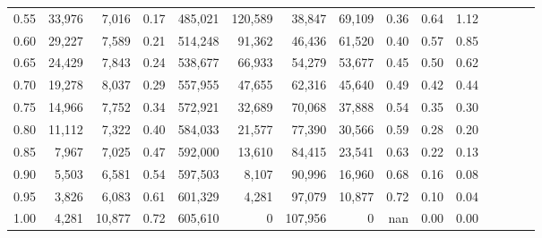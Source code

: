 \begin{tabular}{rrrcrrrrrrrrrrr}
0.55 &  33,976 &   7,016 &                                       0.17 &  485,021 &  120,589 &   38,847 &   69,109 &  0.36 &  0.64 &                         1.12 \\
0.60 &  29,227 &   7,589 &                                       0.21 &  514,248 &   91,362 &   46,436 &   61,520 &  0.40 &  0.57 &                         0.85 \\
0.65 &  24,429 &   7,843 &                                       0.24 &  538,677 &   66,933 &   54,279 &   53,677 &  0.45 &  0.50 &                         0.62 \\
0.70 &  19,278 &   8,037 &                                       0.29 &  557,955 &   47,655 &   62,316 &   45,640 &  0.49 &  0.42 &                         0.44 \\
0.75 &  14,966 &   7,752 &                                       0.34 &  572,921 &   32,689 &   70,068 &   37,888 &  0.54 &  0.35 &                         0.30 \\
0.80 &  11,112 &   7,322 &                                       0.40 &  584,033 &   21,577 &   77,390 &   30,566 &  0.59 &  0.28 &                         0.20 \\
0.85 &   7,967 &   7,025 &                                       0.47 &  592,000 &   13,610 &   84,415 &   23,541 &  0.63 &  0.22 &                         0.13 \\
0.90 &   5,503 &   6,581 &                                       0.54 &  597,503 &    8,107 &   90,996 &   16,960 &  0.68 &  0.16 &                         0.08 \\
0.95 &   3,826 &   6,083 &                                       0.61 &  601,329 &    4,281 &   97,079 &   10,877 &  0.72 &  0.10 &                         0.04 \\
1.00 &   4,281 &  10,877 &                                       0.72 &  605,610 &        0 &  107,956 &        0 &   nan &  0.00 &                         0.00 \\
\bottomrule
\end{tabular}
